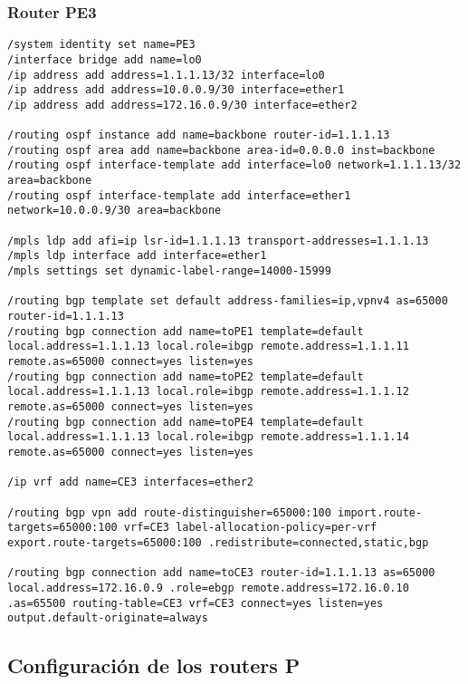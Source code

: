 \subsubsection*{Router PE3}
\begin{lstlisting}[language=RouterOS]
/system identity set name=PE3
/interface bridge add name=lo0
/ip address add address=1.1.1.13/32 interface=lo0
/ip address add address=10.0.0.9/30 interface=ether1
/ip address add address=172.16.0.9/30 interface=ether2

/routing ospf instance add name=backbone router-id=1.1.1.13
/routing ospf area add name=backbone area-id=0.0.0.0 inst=backbone
/routing ospf interface-template add interface=lo0 network=1.1.1.13/32 area=backbone
/routing ospf interface-template add interface=ether1 network=10.0.0.9/30 area=backbone

/mpls ldp add afi=ip lsr-id=1.1.1.13 transport-addresses=1.1.1.13
/mpls ldp interface add interface=ether1
/mpls settings set dynamic-label-range=14000-15999

/routing bgp template set default address-families=ip,vpnv4 as=65000 router-id=1.1.1.13
/routing bgp connection add name=toPE1 template=default local.address=1.1.1.13 local.role=ibgp remote.address=1.1.1.11 remote.as=65000 connect=yes listen=yes
/routing bgp connection add name=toPE2 template=default local.address=1.1.1.13 local.role=ibgp remote.address=1.1.1.12 remote.as=65000 connect=yes listen=yes
/routing bgp connection add name=toPE4 template=default local.address=1.1.1.13 local.role=ibgp remote.address=1.1.1.14 remote.as=65000 connect=yes listen=yes

/ip vrf add name=CE3 interfaces=ether2 

/routing bgp vpn add route-distinguisher=65000:100 import.route-targets=65000:100 vrf=CE3 label-allocation-policy=per-vrf export.route-targets=65000:100 .redistribute=connected,static,bgp

/routing bgp connection add name=toCE3 router-id=1.1.1.13 as=65000 local.address=172.16.0.9 .role=ebgp remote.address=172.16.0.10 .as=65500 routing-table=CE3 vrf=CE3 connect=yes listen=yes output.default-originate=always
\end{lstlisting}

\subsection{Configuración de los routers P}
\label{Apendice2:configuracion_routers_p}

